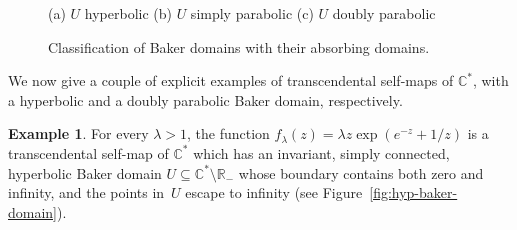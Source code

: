 \documentclass[a4paper, 12pt, reqno]{amsart}
\numberwithin{equation}{section}
\theoremstyle{plain}
\theoremstyle{definition}
\newtheorem{ex}[thm]{Example}
\theoremstyle{remark}
\newcommand{\C}{{\mathbb{C}}}
\newcommand{\R}{{\mathbb{R}}}
\begin{document}
\begin{figure}[h!]
\centering
\def\svgwidth{\linewidth}

\hspace*{17pt}(a) $U$ hyperbolic\hspace*{14pt} (b) $U$\! simply\! parabolic \hspace*{3pt} (c) $U$\! doubly\! parabolic
\caption[Classification of Baker domains with their absorbing domains]{Classification of Baker domains with their absorbing domains.}
\label{fig:bd-types}
\end{figure}

We now give a couple of explicit examples of transcendental self-maps of $\C^*$, with a hyperbolic and a doubly parabolic Baker domain, respectively.

\begin{ex}
For every $\lambda>1$, the function $f_\lambda(z)=\lambda z\exp(e^{-z}+1/z)$ is a transcendental self-map of $\C^*$ which has an invariant, simply connected, hyperbolic Baker domain $U\subseteq \C^*\setminus \R_-$ whose boundary contains both zero and infinity, and the points in~$U$ escape to infinity (see Figure~\ref{fig:hyp-baker-domain}). 
\label{ex:hyp-baker-domain}
\end{ex}
\end{document}
